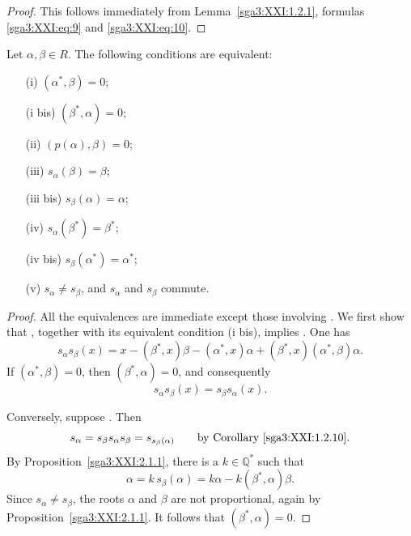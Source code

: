 \begin{proof}
This follows immediately from Lemma~\ref{sga3:XXI:1.2.1},
formulas \eqref{sga3:XXI:eq:9} and \eqref{sga3:XXI:eq:10}.
\end{proof}

\begin{corollary}\label{sga3:XXI:2.2.2}
Let \(\alpha,\beta\in R\). The following conditions are equivalent:
\begin{enumerate}
\item[\SGAInlineRefTarget{sga3:XXI:2.2.2:item:i}(i)] \((\alpha^\ast,\beta)=0\);
\item[(i bis)] \((\beta^\ast,\alpha)=0\);
\item[(ii)] \((p(\alpha),\beta)=0\);
\item[(iii)] \(s_\alpha(\beta)=\beta\);
\item[(iii bis)] \(s_\beta(\alpha)=\alpha\);
\item[(iv)] \(s_\alpha(\beta^\ast)=\beta^\ast\);
\item[(iv bis)] \(s_\beta(\alpha^\ast)=\alpha^\ast\);
\item[\SGAInlineRefTarget{sga3:XXI:2.2.2:item:v}(v)] \(s_\alpha\neq s_\beta\), and \(s_\alpha\) and \(s_\beta\)
  commute.
\end{enumerate}
\end{corollary}

\begin{proof}
All the equivalences are immediate except those involving . We
first show that , together with its equivalent condition (i bis),
implies . One has
\[
 s_\alpha s_\beta(x)
 =x-(\beta^\ast,x)\beta-(\alpha^\ast,x)\alpha
   +(\beta^\ast,x)(\alpha^\ast,\beta)\alpha.
\]
If \((\alpha^\ast,\beta)=0\), then
\((\beta^\ast,\alpha)=0\), and consequently
\[
 s_\alpha s_\beta(x)=s_\beta s_\alpha(x).
\]

Conversely, suppose . Then
\[
 s_\alpha=s_\beta s_\alpha s_\beta
          =s_{s_\beta(\alpha)}
 \qquad\text{by Corollary~\ref{sga3:XXI:1.2.10}.}
\]
By Proposition~\ref{sga3:XXI:2.1.1}, there is a
\(k\in\mathbb Q^\ast\) such that
\[
 \alpha=k\,s_\beta(\alpha)
       =k\alpha-k(\beta^\ast,\alpha)\beta.
\]
Since \(s_\alpha\neq s_\beta\), the roots \(\alpha\) and \(\beta\)
are not proportional, again by Proposition~\ref{sga3:XXI:2.1.1}.
It follows that \((\beta^\ast,\alpha)=0\).
\end{proof}

